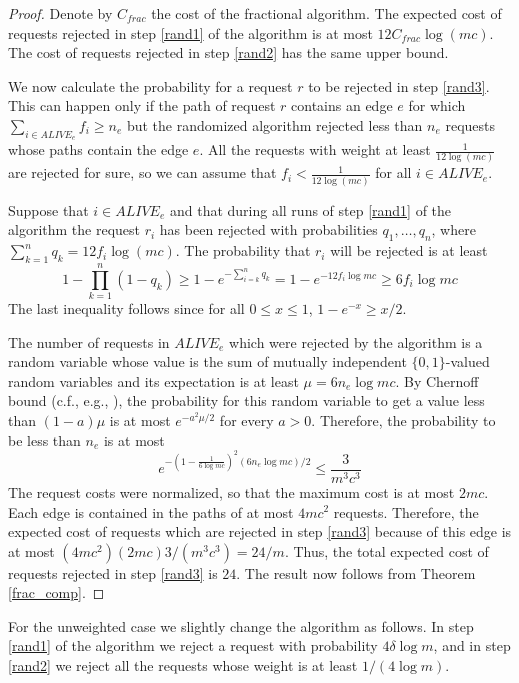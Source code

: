 \documentclass{sig-alternate}
\begin{document}
\begin{proof}
Denote by $C_{frac}$ the cost of the fractional algorithm. The
expected cost of requests rejected in step \ref{rand1} of the
algorithm is at most $12 C_{frac} \log (mc)$. The cost of requests
rejected in step \ref{rand2} has the same upper bound.

We now calculate the probability for a request $r$ to be rejected
in step \ref{rand3}. This can happen only if the path of request
$r$ contains an edge $e$ for which $\sum_{i \in ALIVE_e} f_i \geq
n_e$ but the randomized algorithm rejected less than $n_e$
requests whose paths contain the edge $e$. All the requests with
weight at least $\frac{1}{12 \log (mc)}$ are rejected for sure,
so we can assume that $f_i < \frac{1}{12 \log (mc)}$ for all $i
\in ALIVE_e$.

Suppose that $i \in ALIVE_e$ and that during all runs of step
\ref{rand1} of the algorithm the request $r_i$ has been rejected
with probabilities $q_1,\ldots,q_n$, where $\sum_{k=1}^n q_k = 12
f_i \log (mc)$. The probability that $r_i$ will be rejected is at
least
$$
1-\prod_{k=1}^n (1-q_k) \geq 1-e^{-\sum_{i=k}^n q_k} = 1-e^{-12
f_i \log mc} \geq 6 f_i \log mc
$$
The last inequality follows since for all $0 \leq x \leq 1$,
$1-e^{-x} \geq x/2$.

The number of requests in $ALIVE_e$ which were rejected by the
algorithm is a random variable whose value is the sum of mutually
independent $\{0,1\}$-valued random variables and its expectation
is at least $\mu = 6 n_e \log mc$. By Chernoff bound (c.f., e.g.,
\cite{AS00}), the probability for this random variable to get a
value less than $(1 - a) \mu$ is at most $e^{-a^2 \mu/2}$ for
every $a > 0$. Therefore, the probability to be less than $n_e$ is
at most
$$
e^{-(1-\frac{1}{6 \log mc})^2(6 n_e \log mc)/2} \leq \frac{3}{m^3
c^3}
$$
The request costs were normalized, so that the maximum cost is at
most $2mc$. Each edge is contained in the paths of at most $4mc^2$
requests. Therefore, the expected cost of requests which are
rejected in step \ref{rand3} because of this edge is at most
$(4mc^2) (2mc) 3/(m^3c^3) = 24/m$. Thus, the total expected cost
of requests rejected in step \ref{rand3} is $24$. The result now
follows from Theorem \ref{frac_comp}.

\end{proof}

For the unweighted case we slightly change the algorithm as
follows. In step \ref{rand1} of the algorithm we reject a request
with probability $4\delta \log m$, and in step \ref{rand2} we
reject all the requests whose weight is at least $1 / (4 \log m)$.
\end{document}
